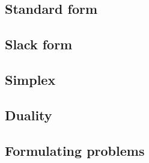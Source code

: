 \subsection{Standard form}

\subsection{Slack form}

\subsection{Simplex}

\subsection{Duality}

\subsection{Formulating problems}

